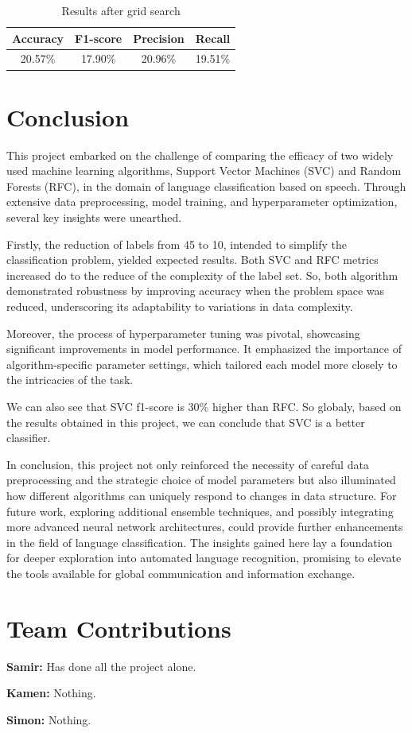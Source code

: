 \documentclass[twocolumn]{article}
\begin{document}
\begin{table}[h]
    \centering
    \begin{tabular}{|c|c|c|c|}
        \hline
         Accuracy & F1-score & Precision & Recall\\
        \hline
         20.57\% & 17.90\% & 20.96\% & 19.51\%\\
        \hline
    \end{tabular}
    
    \label{tab:my_label}
    \caption{Results after grid search}
\end{table}

\section{Conclusion}
This project embarked on the challenge of comparing the efficacy of two widely used machine learning algorithms, Support Vector Machines (SVC) and Random Forests (RFC), in the domain of language classification based on speech. Through extensive data preprocessing, model training, and hyperparameter optimization, several key insights were unearthed.

Firstly, the reduction of labels from 45 to 10, intended to simplify the classification problem, yielded expected results. Both SVC and RFC metrics increased do to the reduce of the complexity of the label set. So, both algorithm demonstrated robustness by improving accuracy when the problem space was reduced, underscoring its adaptability to variations in data complexity.

Moreover, the process of hyperparameter tuning was pivotal, showcasing significant improvements in model performance. It emphasized the importance of algorithm-specific parameter settings, which tailored each model more closely to the intricacies of the task.

We can also see that SVC f1-score is 30\% higher than RFC. So globaly, based on the results obtained in this project, we can conclude that SVC is a better classifier.

In conclusion, this project not only reinforced the necessity of careful data preprocessing and the strategic choice of model parameters but also illuminated how different algorithms can uniquely respond to changes in data structure. For future work, exploring additional ensemble techniques, and possibly integrating more advanced neural network architectures, could provide further enhancements in the field of language classification. The insights gained here lay a foundation for deeper exploration into automated language recognition, promising to elevate the tools available for global communication and information exchange.

\section{Team Contributions}
\textbf{Samir:} Has done all the project alone.

\textbf{Kamen:} Nothing.

\textbf{Simon:} Nothing.
\end{document}
